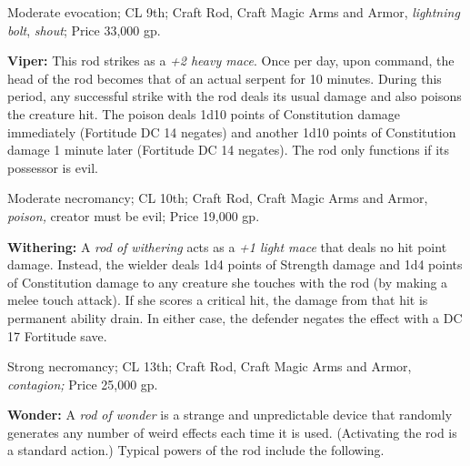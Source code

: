 \documentclass{article}
\begin{document}
Moderate evocation; CL 9th; Craft Rod, Craft Magic Arms and Armor, \textit{lightning 
bolt}, \textit{shout}; Price 33,000 gp.

\textbf{Viper:} This rod strikes as a \textit{+2 heavy mace}. Once per day, upon 
command, the head of the rod becomes that of an actual serpent for 10 minutes. 
During this period, any successful strike with the rod deals its usual damage and 
also poisons the creature hit. The poison deals 1d10 points of Constitution damage 
immediately (Fortitude DC 14 negates) and another 1d10 points of Constitution damage 
1 minute later (Fortitude DC 14 negates). The rod only functions if its possessor 
is evil.

Moderate necromancy; CL 10th; Craft Rod, Craft Magic Arms and Armor, \textit{poison, 
}creator must be evil; Price 19,000 gp.

\textbf{Withering:} A \textit{rod of withering }acts as a \textit{+1 light mace 
}that deals no hit point damage. Instead, the wielder deals 1d4 points of Strength 
damage and 1d4 points of Constitution damage to any creature she touches with the 
rod (by making a melee touch attack). If she scores a critical hit, the damage 
from that hit is permanent ability drain. In either case, the defender negates 
the effect with a DC 17 Fortitude save.

Strong necromancy; CL 13th; Craft Rod, Craft Magic Arms and Armor, \textit{contagion; 
}Price 25,000 gp.

\textbf{Wonder:} A \textit{rod of wonder }is a strange and unpredictable device 
that randomly generates any number of weird effects each time it is used. (Activating 
the rod is a standard action.) Typical powers of the rod include the following.
\end{document}
